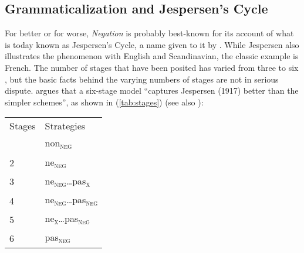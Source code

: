 \documentclass[output=chapter]{langscibook}
\begin{document}
\subsection{Grammaticalization and Jespersen's Cycle}%
\label{sec:grammJesp}

For better or for worse, \textit{Negation} is probably best-known for its account of what is today known as Jespersen's Cycle, a name given to it by \citet{Dahl1979}. While Jespersen also illustrates the phenomenon with English and Scandinavian, the classic example is French. The number of stages that have been posited has varied from three to six \citep[37--39]{Auwera2009}, but the basic facts behind the varying numbers of stages are not in serious dispute.  argues that a six-stage model ``captures Jespersen (1917) better than the simpler schemes'', as shown in (\ref{tab:stages}) (see also \cite[]{Hansen2012}):

\ea \label{tab:stages}
    \begin{tabular}[t]{ll}
    {Stages} & {Strategies} \\\addlinespace
    1 & non\textsubscript{\textsc{neg}} \\
    2 & ne\textsubscript{\textsc{neg}} \\
    3 & ne\textsubscript{\textsc{neg}}\dots pas\textsubscript{\textsc{x}} \\
    4 & ne\textsubscript{\textsc{neg}}\dots pas\textsubscript{\textsc{neg}} \\
    5 & ne\textsubscript{\textsc{x}}\dots pas\textsubscript{\textsc{neg}} \\
    6 & pas\textsubscript{\textsc{neg}}
    \end{tabular}
\z
\end{document}
